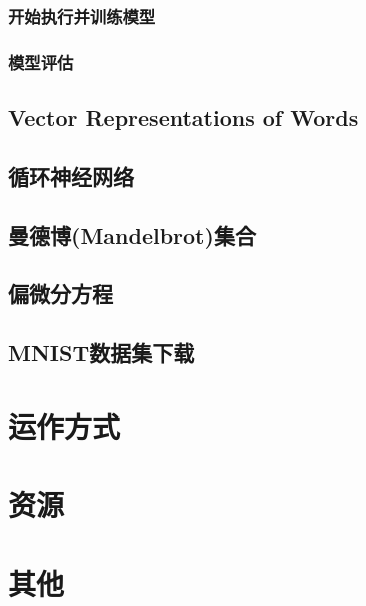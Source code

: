 \documentclass[a4paper,11pt,twoside]{ctexbook}
\begin{document}
\subsection {开始执行并训练模型}
\subsection {模型评估}
\section {Vector Representations of Words}
\section {循环神经网络}
\section {曼德博(Mandelbrot)集合}
\section {偏微分方程}
\section {MNIST数据集下载}


\newpage
\chapter{运作方式}

\newpage
\chapter{资源}

\newpage
\chapter{其他}
\end{document}
